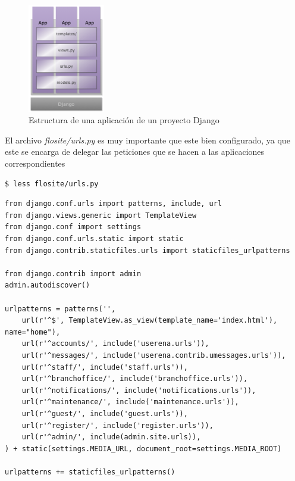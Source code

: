 \begin{figure}[h]
  \begin{center}
    \includegraphics[width=0.3\textwidth]{figures/chapter5/appsdjango2.png}
    \caption[Estructura de una aplicación de un proyecto Django]{Estructura de una aplicación de un proyecto Django}
  \end{center}
\end{figure}

El archivo {\it flosite/urls.py} es muy importante que este bien configurado, ya
que este se encarga de delegar las peticiones que se hacen a las aplicaciones
correspondientes

\begin{verbatim}
$ less flosite/urls.py
\end{verbatim}

\newpage

{\scriptsize
\begin{verbatim}
from django.conf.urls import patterns, include, url
from django.views.generic import TemplateView
from django.conf import settings
from django.conf.urls.static import static
from django.contrib.staticfiles.urls import staticfiles_urlpatterns

from django.contrib import admin
admin.autodiscover()

urlpatterns = patterns('',
    url(r'^$', TemplateView.as_view(template_name='index.html'), name="home"),
    url(r'^accounts/', include('userena.urls')),
    url(r'^messages/', include('userena.contrib.umessages.urls')),
    url(r'^staff/', include('staff.urls')),
    url(r'^branchoffice/', include('branchoffice.urls')),
    url(r'^notifications/', include('notifications.urls')),
    url(r'^maintenance/', include('maintenance.urls')),
    url(r'^guest/', include('guest.urls')),
    url(r'^register/', include('register.urls')),
    url(r'^admin/', include(admin.site.urls)),
) + static(settings.MEDIA_URL, document_root=settings.MEDIA_ROOT)

urlpatterns += staticfiles_urlpatterns()
\end{verbatim}
}

